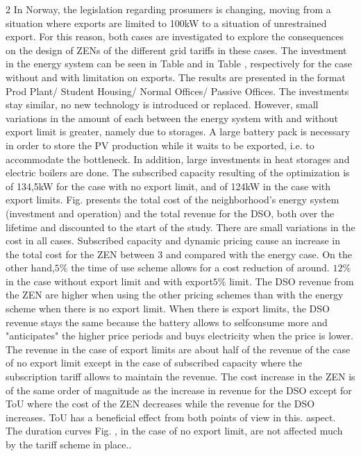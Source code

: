 \documentclass{article}
\begin{document}
\begin{paracol}{2}
In Norway, the legislation regarding prosumers is changing,
moving from a situation where exports are limited to 100kW
to a situation of unrestrained export. For this reason, both
cases are investigated to explore the consequences on the
design of ZENs of the different grid tariffs in these cases.
The investment in the energy system can be seen in Table
and in Table , respectively for the case without and with
limitation on exports. The results are presented in the format
Prod Plant/ Student Housing/ Normal Offices/ Passive Offices.
The investments stay similar, no new technology is introduced
or replaced. However, small variations in the amount of each
between the energy system with and without export limit
is greater, namely due to storages. A large battery pack is
necessary in order to store the PV production while it waits to
be exported, i.e. to accommodate the bottleneck. In addition,
large investments in heat storages and electric boilers are done.
The subscribed capacity resulting of the optimization is of
134,5kW for the case with no export limit, and of 124kW
in the case with export limits. Fig. presents the total cost of
the neighborhood's energy system (investment and operation)
and the total revenue for the DSO, both over the lifetime and
discounted to the start of the study. There are small variations
in the cost in all cases. Subscribed capacity and dynamic
pricing cause an increase in the total cost for the ZEN between
3 and compared with the energy case. On the other hand,$5 \%$
the time of use scheme allows for a cost reduction of around.
$1 2 \%$ in the case without export limit and with export$5 \%$
limit. The DSO revenue from the ZEN are higher when using
the other pricing schemes than with the energy scheme when
there is no export limit. When there is export limits, the DSO
revenue stays the same because the battery allows to selfconsume more and "anticipates" the higher price periods and
buys electricity when the price is lower. The revenue in the
case of export limits are about half of the revenue of the case of
no export limit except in the case of subscribed capacity where
the subscription tariff allows to maintain the revenue. The cost
increase in the ZEN is of the same order of magnitude as the
increase in revenue for the DSO except for ToU where the cost
of the ZEN decreases while the revenue for the DSO increases.
ToU has a beneficial effect from both points of view in this.
aspect. The duration curves Fig. , in the case of no export
limit, are not affected much by the tariff scheme in place..

\end{paracol}
\end{document}

